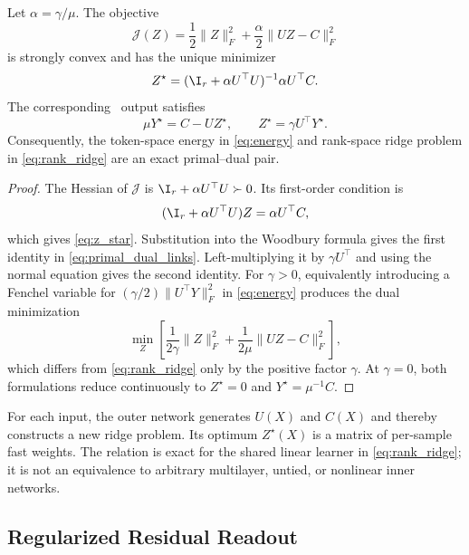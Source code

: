 \begin{theorem}
\label{thm:inner_learner}
Let $\alpha=\gamma/\mu$. The objective
\begin{equation}
  \mathcal J(Z)
  =\frac12\lVert Z\rVert_F^2
  +\frac{\alpha}{2}\lVert UZ-C\rVert_F^2
  \label{eq:rank_ridge}
\end{equation}
is strongly convex and has the unique minimizer
\begin{equation}
  Z^\star
  =(\I_r+\alpha U^\top U)^{-1}\alpha U^\top C.
  \label{eq:z_star}
\end{equation}
The corresponding \LSSO\ output satisfies
\begin{equation}
  \mu Y^\star=C-UZ^\star,
  \qquad
  Z^\star=\gamma U^\top Y^\star.
  \label{eq:primal_dual_links}
\end{equation}
Consequently, the token-space energy in \cref{eq:energy} and rank-space ridge
problem in \cref{eq:rank_ridge} are an exact primal--dual pair.
\end{theorem}
\begin{proof}
The Hessian of $\mathcal J$ is
$\I_r+\alpha U^\top U\succ0$. Its first-order condition is
\[
  (\I_r+\alpha U^\top U)Z=\alpha U^\top C,
\]
which gives \cref{eq:z_star}. Substitution into the Woodbury formula gives the
first identity in \cref{eq:primal_dual_links}. Left-multiplying it by
$\gamma U^\top$ and using the normal equation gives the second identity.
For $\gamma>0$, equivalently introducing a Fenchel variable for
$(\gamma/2)\lVert U^\top Y\rVert_F^2$ in \cref{eq:energy} produces the dual
minimization
\[
  \min_Z
  \left[
    \frac{1}{2\gamma}\lVert Z\rVert_F^2
    +\frac{1}{2\mu}\lVert UZ-C\rVert_F^2
  \right],
\]
which differs from \cref{eq:rank_ridge} only by the positive factor $\gamma$.
At $\gamma=0$, both formulations reduce continuously to $Z^\star=0$ and
$Y^\star=\mu^{-1}C$.
\end{proof}

For each input, the outer network generates $U(X)$ and $C(X)$ and thereby
constructs a new ridge problem. Its optimum $Z^\star(X)$ is a matrix of
per-sample fast weights. The relation is exact for the shared linear learner in
\cref{eq:rank_ridge}; it is not an equivalence to arbitrary multilayer,
untied, or nonlinear inner networks.

\subsection{Regularized Residual Readout}

